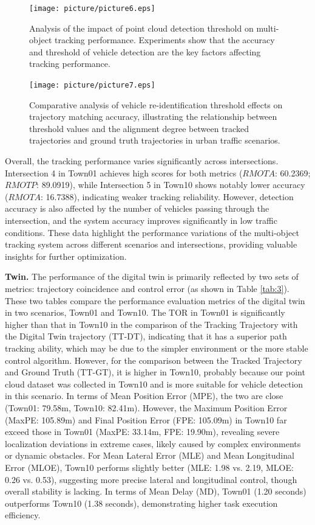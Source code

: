 \documentclass[journal,twoside,web]{ieeecolor}
\begin{document}
\begin{figure}[!t]
	\centering
	\centerline{\texttt{[image: picture/picture6.eps]}}
	\caption{Analysis of the impact of point cloud detection threshold on multi-object tracking performance. Experiments show that the accuracy and threshold of vehicle detection are the key factors affecting tracking performance.} 
	\label{fig:6} 
\end{figure}

\begin{figure}[!t]
	\centering
		\centerline{\texttt{[image: picture/picture7.eps]}}
	\caption{Comparative analysis of vehicle re-identification threshold effects on trajectory matching accuracy, illustrating the relationship between threshold values and the alignment degree between tracked trajectories and ground truth trajectories in urban traffic scenarios.} 
	\label{fig:7} 
\end{figure}

Overall, the tracking performance varies significantly across intersections. Intersection 4 in Town01 achieves high scores for both metrics (\(RMOTA\): 60.2369; \(RMOTP\): 89.0919), while Intersection 5 in Town10 shows notably lower accuracy (\(RMOTA\): 16.7388), indicating weaker tracking reliability.
However, detection accuracy is also affected by the number of vehicles passing through the intersection, and the system accuracy improves significantly in low traffic conditions.
These data highlight the performance variations of the multi-object tracking system across different scenarios and intersections, providing valuable insights for further optimization.

\textbf{Twin.}
The performance of the digital twin is primarily reflected by two sets of metrics: trajectory coincidence and control error (as shown in Table \ref{tab:3}). 
These two tables compare the performance evaluation metrics of the digital twin in two scenarios, Town01 and Town10. 
The TOR in Town01 is significantly higher than that in Town10 in the comparison of the Tracking Trajectory with the Digital Twin trajectory (TT-DT), indicating that it has a superior path tracking ability, which may be due to the simpler environment or the more stable control algorithm.
However, for the comparison between the Tracked Trajectory and Ground Truth (TT-GT), it is higher in Town10, probably because our point cloud dataset was collected in Town10 and is more suitable for vehicle detection in this scenario.
In terms of Mean Position Error (MPE), the two are close (Town01: 79.58m, Town10: 82.41m). 
However, the Maximum Position Error (MaxPE: 105.89m) and Final Position Error (FPE: 105.09m) in Town10 far exceed those in Town01 (MaxPE: 33.14m, FPE: 19.90m), revealing severe localization deviations in extreme cases, likely caused by complex environments or dynamic obstacles. 
For Mean Lateral Error (MLE) and Mean Longitudinal Error (MLOE), Town10 performs slightly better (MLE: 1.98 vs. 2.19, MLOE: 0.26 vs. 0.53), suggesting more precise lateral and longitudinal control, though overall stability is lacking. 
In terms of Mean Delay (MD), Town01 (1.20 seconds) outperforms Town10 (1.38 seconds), demonstrating higher task execution efficiency.
\end{document}
